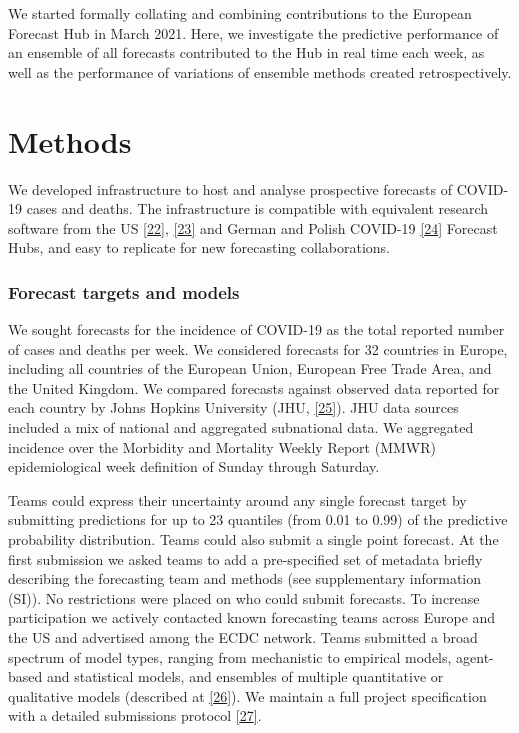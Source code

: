 \documentclass[
]{article}
\begin{document}
We started formally collating and combining contributions to the European Forecast Hub in March 2021. Here, we investigate the predictive performance of an ensemble of all forecasts contributed to the Hub in real time each week, as well as the performance of variations of ensemble methods created retrospectively.

\hypertarget{methods}{%
\section{Methods}\label{methods}}

We developed infrastructure to host and analyse prospective forecasts of COVID-19 cases and deaths. The infrastructure is compatible with equivalent research software from the US \protect\hyperlink{ref-cramerReichlabCovid19forecasthubRelease2021}{{[}22{]}}, \protect\hyperlink{ref-wangReichlabCovidHubUtilsRepository2021}{{[}23{]}} and German and Polish COVID-19 \protect\hyperlink{ref-bracherGermanPolishCOVID192020}{{[}24{]}} Forecast Hubs, and easy to replicate for new forecasting collaborations.

\hypertarget{forecast-targets-and-models}{%
\subsubsection{Forecast targets and models}\label{forecast-targets-and-models}}

We sought forecasts for the incidence of COVID-19 as the total reported number of cases and deaths per week. We considered forecasts for 32 countries in Europe, including all countries of the European Union, European Free Trade Area, and the United Kingdom. We compared forecasts against observed data reported for each country by Johns Hopkins University (JHU, \protect\hyperlink{ref-dongInteractiveWebbasedDashboard2020}{{[}25{]}}). JHU data sources included a mix of national and aggregated subnational data. We aggregated incidence over the Morbidity and Mortality Weekly Report (MMWR) epidemiological week definition of Sunday through Saturday.

Teams could express their uncertainty around any single forecast target by submitting predictions for up to 23 quantiles (from 0.01 to 0.99) of the predictive probability distribution. Teams could also submit a single point forecast. At the first submission we asked teams to add a pre-specified set of metadata briefly describing the forecasting team and methods (see supplementary information (SI)). No restrictions were placed on who could submit forecasts. To increase participation we actively contacted known forecasting teams across Europe and the US and advertised among the ECDC network. Teams submitted a broad spectrum of model types, ranging from mechanistic to empirical models, agent-based and statistical models, and ensembles of multiple quantitative or qualitative models (described at \protect\hyperlink{ref-europeancovid-19forecasthubCommunity}{{[}26{]}}). We maintain a full project specification with a detailed submissions protocol \protect\hyperlink{ref-europeancovid-19forecasthubCovid19forecasthubeuropeWiki}{{[}27{]}}.
\end{document}
